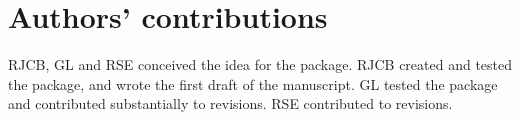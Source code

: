\documentclass{article}
\begin{document}
\section{Authors' contributions}

RJCB, GL and RSE conceived the idea for the package. 
RJCB created and tested the package, and wrote the first draft of the manuscript.
GL tested the package and contributed substantially to revisions.
RSE contributed to revisions.



\end{document}
